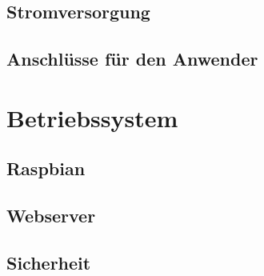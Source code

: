 \documentclass[
    headings=optiontotocandhead,%
    twoside,
    numbers=noenddot,%
    toc=flat, %
    12pt, %
    titlepage, %
    parskip=full, %
    listof=totoc, %
    listof=flat, %
    numbers=noenddot, %
    bibliography=totoc, %
    a4paper,DIV=14,
    BCOR=15mm,
]{scrbook}
\begin{document}
\renewcommand{\kapitelautor}{Autor: Clemens Scharwitzl}

% 

\section{Stromversorgung}\label{Stromversorgung}

\renewcommand{\kapitelautor}{Autor: Clemens Scharwitzl}

% 

\section{Anschlüsse für den Anwender}\label{Anschlüsse-für-den-Anwender}

\renewcommand{\kapitelautor}{Autor: Clemens Scharwitzl}

% 

\chapter{Betriebssystem}\label{Betriebssystem}



\section{Raspbian}\label{Raspbian}

\renewcommand{\kapitelautor}{Autor: Clemens Scharwitzl}



\section{Webserver}\label{Webserver}

\renewcommand{\kapitelautor}{Autor: Clemens Scharwitzl}



\section{Sicherheit}\label{Sicherheit}

\renewcommand{\kapitelautor}{Autor: Clemens Scharwitzl}
\end{document}
